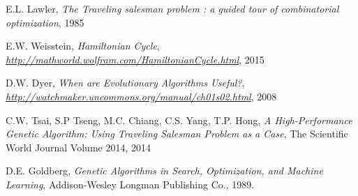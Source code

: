 \documentclass[article]{IEEEtran}
\begin{document}
\begin{thebibliography}{9}

E.L. Lawler, \textit{The Traveling salesman problem : a guided tour of combinatorial optimization},
1985

E.W. Weisstein, \textit{Hamiltonian Cycle},
\textit{\url{http://mathworld.wolfram.com/HamiltonianCycle.html}}, 2015

D.W. Dyer, \textit{When are Evolutionary Algorithms Useful?},
\textit{\url{http://watchmaker.uncommons.org/manual/ch01s02.html}}, 2008

C.W. Tsai, S.P Tseng, M.C. Chiang, C.S. Yang, T.P. Hong, \textit{A High-Performance Genetic Algorithm: Using Traveling Salesman Problem as a Case},
The Scientific World Journal Volume 2014, 2014

D.E. Goldberg, \textit{Genetic Algorithms in Search, Optimization, and Machine Learning},
Addison-Wesley Longman Publishing Co., 1989. 

\end{thebibliography}
\end{document}
